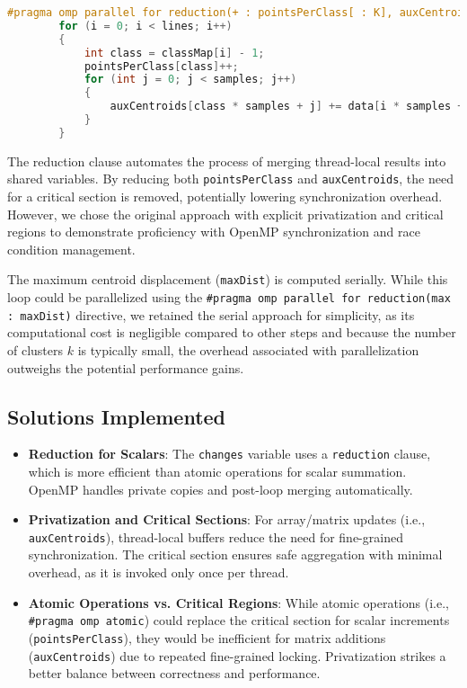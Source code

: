 \documentclass[11pt, journal]{IEEEtran}
\newcommand{\nwl}{

\vspace{11pt}

}
\begin{document}
\begin{lstlisting}[language = C]
#pragma omp parallel for reduction(+ : pointsPerClass[ : K], auxCentroids[ : K * samples])
		for (i = 0; i < lines; i++)
		{
			int class = classMap[i] - 1;
			pointsPerClass[class]++;
			for (int j = 0; j < samples; j++)
			{
				auxCentroids[class * samples + j] += data[i * samples + j];
			}
		}\end{lstlisting}
\nwl
The reduction clause automates the process of merging thread-local results into shared variables. By reducing both \texttt{pointsPerClass} and \texttt{auxCentroids}, the need for a critical section is removed, potentially lowering synchronization overhead.
However, we chose the original approach with explicit privatization and critical regions to demonstrate proficiency with OpenMP synchronization and race condition management. 
\nwl
The maximum centroid displacement (\texttt{maxDist}) is computed serially. While this loop could be parallelized using the \texttt{\#pragma omp parallel for reduction(max : maxDist)} directive, we retained the serial approach for simplicity, as its computational cost is negligible compared to other steps and because the number of clusters $k$ is typically small, the overhead associated with parallelization outweighs the potential performance gains.

\subsection{Solutions Implemented}

\begin{itemize}
    \item \textbf{Reduction for Scalars}: The \texttt{changes} variable uses a \texttt{reduction} clause, which is more efficient than atomic operations for scalar summation. OpenMP handles private copies and post-loop merging automatically.
    \item \textbf{Privatization and Critical Sections}: For array/matrix updates (i.e., \texttt{auxCentroids}), thread-local buffers reduce the need for fine-grained synchronization. The critical section ensures safe aggregation with minimal overhead, as it is invoked only once per thread.
    \item \textbf{Atomic Operations vs. Critical Regions}: While atomic operations (i.e., \texttt{\#pragma omp atomic}) could replace the critical section for scalar increments (\texttt{pointsPerClass}), they would be inefficient for matrix additions (\texttt{auxCentroids}) due to repeated fine-grained locking. Privatization strikes a better balance between correctness and performance.
\end{itemize}
\end{document}
